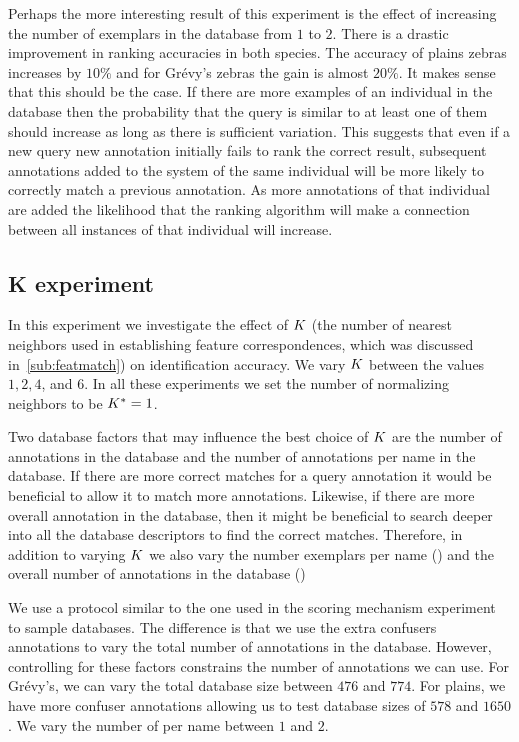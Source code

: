         Perhaps the more interesting result of this experiment is the effect of increasing the number of exemplars
        in the database from $1$ to $2$. There is a drastic improvement in ranking accuracies in both species. The
        accuracy of plains zebras increases by $10\percent$ and for Grévy's zebras the gain is almost $20\percent$.
        It makes sense that this should be the case. If there are more examples of an individual in the database
        then the probability that the query is similar to at least one of them should increase as long as there is
        sufficient variation. This suggests that even if a new query new annotation initially fails to rank the
        correct result, subsequent annotations added to the system of the same individual will be more likely to
        correctly match a previous annotation. As more annotations of that individual are added the likelihood that
        the ranking algorithm will make a connection between all instances of that individual will increase.

        \NScoreExpt{}


    \FloatBarrier{}
    \subsection{K experiment}\label{sub:exptk}  

        In this experiment we investigate the effect of $K$ (the number of nearest neighbors used in establishing
        feature correspondences, which was discussed in~\cref{sub:featmatch}) on identification accuracy. We vary
        $K$ between the values $1, 2, 4$, and $6$. In all these experiments we set the number of normalizing
        neighbors to be $K^{*}=1$.

        Two database factors that may influence the best choice of $K$ are the number of annotations in the
        database and the number of annotations per name in the database. If there are more correct matches for a
        query annotation it would be beneficial to allow it to match more annotations. Likewise, if there are more
        overall annotation in the database, then it might be beneficial to search deeper into all the database
        descriptors to find the correct matches. Therefore, in addition to varying $K$ we also vary the number
        exemplars per name () and the overall number of annotations in the database ()

        We use a protocol similar to the one used in the scoring mechanism experiment to sample databases.
        The difference is that we use the extra confusers annotations to vary the total number of annotations in
          the database.
        However, controlling for these factors constrains the number of annotations we can use.
        For Grévy's, we can vary the total database size between $476$ and $774$.
        For plains, we have more confuser annotations allowing us to test database sizes of $578$ and $1650$.
        We vary the number of \exemplars{} per name between $1$ and $2$.

